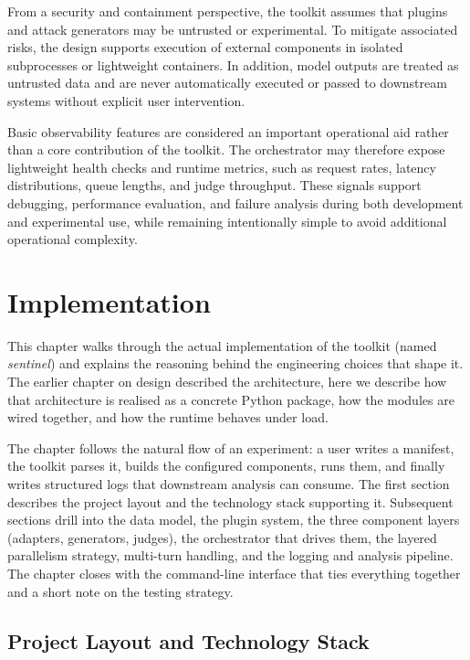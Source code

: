 From a security and containment perspective, the toolkit assumes that plugins and attack generators may be untrusted or experimental.
To mitigate associated risks, the design supports execution of external components in isolated subprocesses or lightweight containers.
In addition, model outputs are treated as untrusted data and are never automatically executed or passed to downstream systems without explicit user intervention.

Basic observability features are considered an important operational aid rather than a core contribution of the toolkit.
The orchestrator may therefore expose lightweight health checks and runtime metrics, such as request rates, latency distributions, queue lengths, and judge throughput.
These signals support debugging, performance evaluation, and failure analysis during both development and experimental use, while remaining intentionally simple to avoid additional operational complexity.

\chapter{Implementation}\label{ch:implementation}


This chapter walks through the actual implementation of the toolkit (named \emph{sentinel}) and explains the reasoning behind the engineering choices that shape it.
The earlier chapter on design described the architecture, here we describe how that architecture is realised as a concrete Python package, how the modules are wired together, and how the runtime behaves under load.

The chapter follows the natural flow of an experiment: a user writes a manifest, the toolkit parses it, builds the configured components, runs them, and finally writes structured logs that downstream analysis can consume.
The first section describes the project layout and the technology stack supporting it.
Subsequent sections drill into the data model, the plugin system, the three component layers (adapters, generators, judges), the orchestrator that drives them, the layered parallelism strategy, multi-turn handling, and the logging and analysis pipeline.
The chapter closes with the command-line interface that ties everything together and a short note on the testing strategy.

\section{Project Layout and Technology Stack}\label{sec:impl-layout}

